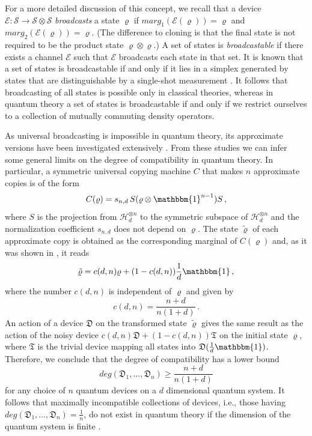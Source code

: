 \documentclass[12pt]{iopart}
\theoremstyle{definition}
\newcommand{\hi}{\mathcal{H}} %
\newcommand{\id}{\mathbbm{1}} %
\newcommand{\Ec}{\mathcal{E}} %
\newcommand{\Dev}{\mathfrak{D}} %
\newcommand{\Triv}{\mathfrak{T}} %
\begin{document}
For a more detailed discussion of this concept, we recall that a device $\Ec:\mathcal{S}\to\mathcal{S}\otimes\mathcal{S}$ \emph{broadcasts} a state $\varrho$ if $marg_1 (\Ec(\varrho)) = \varrho$ and $marg_2(\Ec(\varrho)) = \varrho$.
(The difference to cloning is that the final state is not required to be the product state $\varrho\otimes\varrho$.)
A set of states is \emph{broadcastable} if there exists a channel $\Ec$ such that $\Ec$ broadcasts each state in that set.
It is known that a set of states is broadcastable if and only if it lies in a simplex generated by states that are distinguishable by a single-shot measurement \cite{BaBaLeWi07}.
It follows that broadcasting of all states is possible only in classical theories, whereas in quantum theory a set of states is broadcastable if and only if we restrict ourselves to a collection of mutually commuting density operators.

As universal broadcasting is impossible in quantum theory, its approximate versions have been investigated extensively \cite{ScIbGiAc05}.
From these studies we can infer some general limits on the degree of compatibility in quantum theory. 
In particular, a symmetric universal copying machine $C$ that makes $n$ approximate copies is of the form \cite{KeWe99}
\begin{equation}
C(\varrho) = s_{n,d} \, S(\varrho \otimes \id^{n-1}) S\, , 
\end{equation}
where $S$ is the projection from $\hi_d^{\otimes n}$ to the symmetric subspace of $\hi_d^{\otimes n}$ and the normalization coefficient $s_{n,d}$ does not depend on $\varrho$.
The state $\tilde{\varrho}$ of each approximate copy is obtained as the corresponding marginal of $C(\varrho)$ and, as it was shown in \cite{Werner98}, it reads
\begin{equation}
\tilde{\varrho} = c(d,n) \varrho + (1-c(d,n)) \frac{1}{d} \id \, ,
\end{equation}
where the number $c(d,n)$ is independent of $\varrho$ and given by
\begin{equation}
c(d,n) = \frac{n+d}{n(1+d)} \, .
\end{equation} 
An action of a device $\Dev$ on the transformed state $\tilde{\varrho}$ gives the same result as the action of the noisy device $c(d,n) \Dev + (1-c(d,n)) \Triv$ on the initial state $\varrho$, where $\Triv$ is the trivial device mapping all states into $\Dev(\frac{1}{d} \id)$.
Therefore, we conclude that the degree of compatibility has a lower bound
\begin{equation}\label{eq:bc-bound}
deg(\Dev_1,\ldots,\Dev_n) \geq \frac{n+d}{n(1+d)}
\end{equation}
for any choice of $n$ quantum devices on a $d$ dimensional quantum system.
It follows that maximally incompatible collections of devices, i.e., those having $deg(\Dev_1,\ldots,\Dev_n) = \frac{1}{n}$, do not exist in quantum theory if the dimension of the quantum system is finite \cite{HeScToZi14}.
\end{document}
